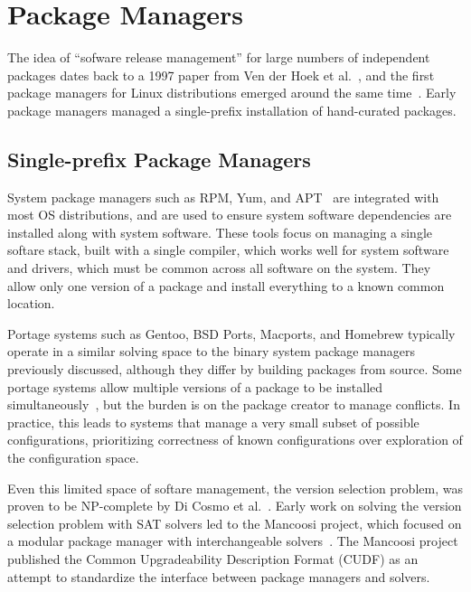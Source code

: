 \section{Package Managers}
\label{sec:pack-managers}

The idea of ``sofware release management'' for large numbers of independent packages dates back to a 1997 paper from Ven der Hoek et al.~\cite{van1997software}, and the first package managers for Linux distributions emerged around the same time~\cite{rpm,apt}. Early package managers managed a single-prefix installation of hand-curated packages.

\subsection{Single-prefix Package Managers}

System package managers such as RPM, Yum, and APT~\cite{foster+:rpm03,silva:apt01,yum} are integrated with most OS distributions, and are used to ensure system software dependencies are installed along with system software.
These tools focus on managing a single softare stack, built with a single compiler, which works well for system software and drivers, which must be common across all software on the system.
They allow only one version of a package and install everything to a known common location.

Portage systems such as Gentoo, BSD Ports, Macports, and Homebrew typically operate in a similar solving space to the binary system package managers previously discussed, although they differ by building packages from source.
Some portage systems allow multiple versions of a package to be installed simultaneously~\cite{groffen:gentoo-prefix}, but the burden is on the package creator to manage conflicts.
In practice, this leads to systems that manage a very small subset of possible configurations, prioritizing correctness of known configurations over exploration of the configuration space.

Even this limited space of softare management, the version selection problem, was proven to be NP-complete by Di Cosmo et al.~\cite{dicosmo:edos,mancinelli+:ase06-foss-distros}.
Early work on solving the version selection problem with SAT solvers led to the Mancoosi project, which focused on a modular package manager with interchangeable solvers~\cite{abate2012dependency,abate-2013-modular-package-manager}.
The Mancoosi project published the Common Upgradeability Description Format (CUDF) as an attempt to standardize the interface between package managers and solvers.

